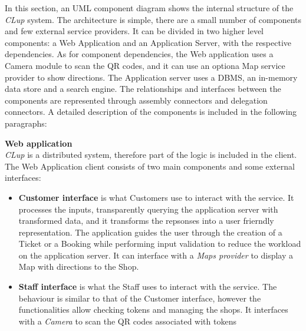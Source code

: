 In this section, an UML component diagram shows the internal structure of the \emph{CLup} system. The architecture is simple, there are a small number of components and few external service providers. It can be divided in two higher level components: a Web Application and an Application Server, with the respective dependencies.
As for component dependencies, the Web application uses a Camera module to scan the QR codes, and it can use an optiona Map service provider to show directions. The Application server uses a DBMS, an in-memory data store and a search engine.
The relationships and interfaces between the components are represented through assembly connectors and delegation connectors.
A detailed description of the components is included in the following paragraphs:

\textbf{Web application}\\
\emph{CLup} is a distributed system, therefore part of the logic is included in the client. The Web Application client consists of two main components and some external interfaces:
\begin{itemize}
    \item \textbf{Customer interface} is what Customers use to interact with the service. It processes the inputs, transparently querying the application server with transformed data, and it transforms the repsonses into a user frierndly representation. The application guides the user through the creation of a Ticket or a Booking while performing input validation to reduce the workload on the application server. It can interface with a \emph{Maps provider} to display a Map with directions to the Shop.
    \item \textbf{Staff interface} is what the Staff uses to interact with the service. The behaviour is similar to that of the Customer interface, however the functionalities allow checking tokens and managing the shops. It interfaces with a \emph{Camera} to scan the QR codes associated with tokens
\end{itemize}

